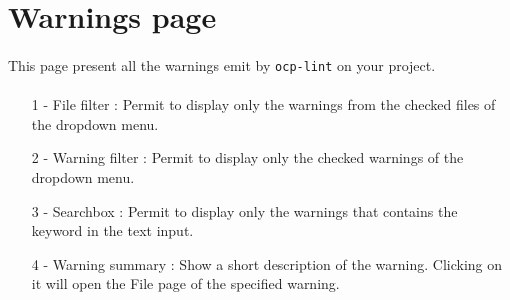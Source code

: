 \documentclass{article}
\begin{document}
\newpage

\section{Warnings page}
\vspace{\baselineskip}

\paragraph{}

\vspace{\baselineskip}

\paragraph{}
This page present all the warnings emit by \texttt{ocp-lint} on your project.

\paragraph{}
\begin{itemize}
	\item[1 -] File filter : Permit to display only the warnings from the checked files of the dropdown menu.
	\item[2 -] Warning filter : Permit to display only the checked warnings of the dropdown menu.
    \item[3 -] Searchbox : Permit to display only the warnings that contains the keyword in the text input.
    \item[4 -] Warning summary : Show a short description of the warning. Clicking on it will open the File page of the specified warning.
\end{itemize}
\end{document}
